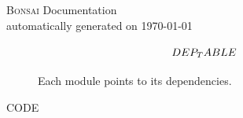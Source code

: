 \documentclass{article}
\begin{document}
    \begin{center}
        \LARGE
        \textsc{Bonsai} Documentation \\ 
        \vspace{0.1cm}
        \large
        automatically generated on \today
    \end{center}

    \begin{landscape}
        \footnotesize
        \begin{figure}
            $$
                \begin{tikzcd}
                    DEP_TABLE
                \end{tikzcd}
            $$
            \caption{Each module points to its dependencies.}
        \end{figure}
    \end{landscape}

    CODE
\end{document}
